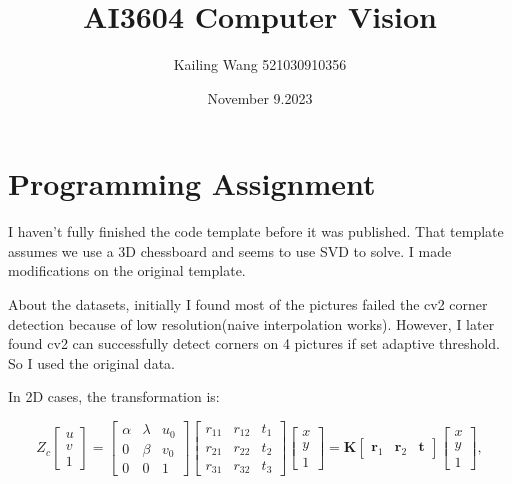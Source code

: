 \documentclass{article}
\theoremstyle{definition}
\begin{document}
	\title{AI3604 Computer Vision}
	\author{Kailing Wang 521030910356}
	\date{November 9.2023}
	\maketitle
	\section*{Programming Assignment}
	I haven't fully finished the code template before it was published. That template assumes we use a 3D chessboard and seems to use SVD to solve. I made modifications on the original template.
	
	About the datasets, initially I found most of the pictures failed the cv2 corner detection because of low resolution(naive interpolation works). However, I later found cv2 can successfully detect corners on 4 pictures if set adaptive threshold. So I used the original data. 
	
	In 2D cases, the transformation is:
	
	\begin{equation}
		Z_c\left[\begin{array}{l}
			u \\
			v \\
			1
		\end{array}\right]=\left[\begin{array}{ccc}
			\alpha & \lambda & u_0 \\
			0 & \beta & v_0 \\
			0 & 0 & 1
		\end{array}\right]\left[\begin{array}{lll}
			r_{11} & r_{12} & t_1 \\
			r_{21} & r_{22} & t_2 \\
			r_{31} & r_{32} & t_3
		\end{array}\right]\left[\begin{array}{c}
			x \\
			y \\
			1
		\end{array}\right]=\mathbf{K}\left[\begin{array}{lll}
			\mathbf{r}_1 & \mathbf{r}_2 & \mathbf{t}
		\end{array}\right]\left[\begin{array}{c}
			x \\
			y \\
			1
		\end{array}\right],
	\end{equation}
	
\end{document}
